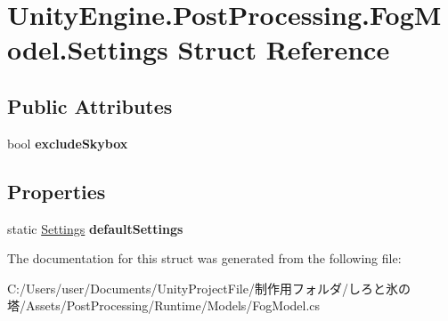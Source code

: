 \hypertarget{struct_unity_engine_1_1_post_processing_1_1_fog_model_1_1_settings}{}\section{Unity\+Engine.\+Post\+Processing.\+Fog\+Model.\+Settings Struct Reference}
\label{struct_unity_engine_1_1_post_processing_1_1_fog_model_1_1_settings}
\subsection*{Public Attributes}
\begin{DoxyCompactItemize}
\item 
\mbox{\label{struct_unity_engine_1_1_post_processing_1_1_fog_model_1_1_settings_a7544429209548509f527ae854bd69684}} 
bool {\bfseries exclude\+Skybox}
\end{DoxyCompactItemize}
\subsection*{Properties}
\begin{DoxyCompactItemize}
\item 
\mbox{\label{struct_unity_engine_1_1_post_processing_1_1_fog_model_1_1_settings_a0d0b889397232348949b1b3357cef242}} 
static \hyperlink{struct_unity_engine_1_1_post_processing_1_1_fog_model_1_1_settings}{Settings} {\bfseries default\+Settings}
\end{DoxyCompactItemize}


The documentation for this struct was generated from the following file\+:\begin{DoxyCompactItemize}
\item 
C\+:/\+Users/user/\+Documents/\+Unity\+Project\+File/制作用フォルダ/しろと氷の塔/\+Assets/\+Post\+Processing/\+Runtime/\+Models/Fog\+Model.\+cs\end{DoxyCompactItemize}
